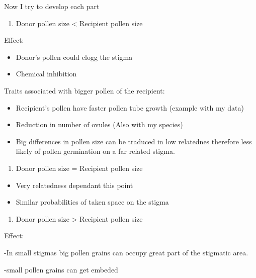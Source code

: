 \documentclass[11pt,a4paper]{article}
\providecommand{\tightlist}{%
  \setlength{\itemsep}{0pt}\setlength{\parskip}{0pt}}
\begin{document}
Now I try to develop each part

\begin{enumerate}
\def\labelenumi{\arabic{enumi})}
\tightlist
\item
  Donor pollen size \textless{} Recipient pollen size
\end{enumerate}

Effect:

\begin{itemize}
\item
  Donor's pollen could clogg the stigma
\item
  Chemical inhibition
\end{itemize}

Traits associated with bigger pollen of the recipient:

\begin{itemize}
\item
  Recipient's pollen have faster pollen tube growth (example with my
  data)
\item
  Reduction in number of ovules (Also with my species)
\item
  Big differences in pollen size can be traduced in low relatednes
  therefore less likely of pollen germination on a far related stigma.
\end{itemize}

\begin{enumerate}
\def\labelenumi{\arabic{enumi})}
\setcounter{enumi}{1}
\tightlist
\item
  Donor pollen size = Recipient pollen size
\end{enumerate}

\begin{itemize}
\item
  Very relatedness dependant this point
\item
  Similar probabilities of taken space on the stigma
\end{itemize}

\begin{enumerate}
\def\labelenumi{\arabic{enumi})}
\setcounter{enumi}{2}
\tightlist
\item
  Donor pollen size \textgreater{} Recipient pollen size
\end{enumerate}

Effect:

-In small stigmas big pollen grains can occupy great part of the
stigmatic area.

-small pollen grains can get embeded
\end{document}
